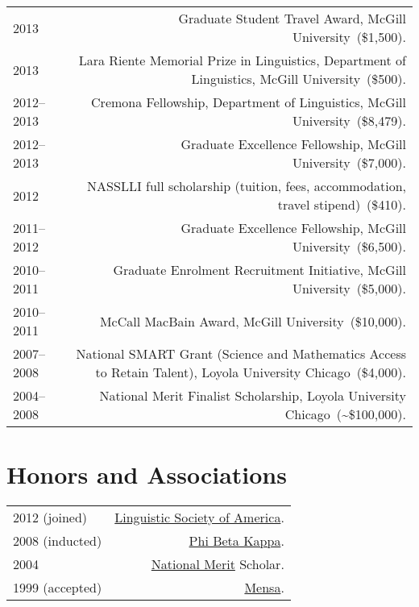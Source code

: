 \documentclass[letterpaper]{article}
\makeatletter
\newcommand{\myvrule}{\color{lightgray}\vrule width 1.0pt}
\newenvironment{cvsection}{%
  \vspace{-3ex}
  \renewcommand{\arraystretch}{1.5}
  \begin{longtable}{@{} L R @{}}
}{%
  \end{longtable}
  \vspace{1ex}
  \renewcommand{\arraystretch}{1.0}
}
\newcommand{\award}[2]{%
  #1~(#2). %
}
\makeatother
\begin{document}
\begin{cvsection}
  2013 & \award{Graduate Student Travel Award, McGill University}{\$1,500} \\

  2013 & \award{Lara Riente Memorial Prize in Linguistics, Department of
  Linguistics, McGill University}{\$500} \\

  2012--2013 & \award{Cremona Fellowship, Department of Linguistics, McGill
  University}{\$8,479} \\

  2012--2013 & \award{Graduate Excellence Fellowship, McGill
  University}{\$7,000} \\

  2012 & \award{NASSLLI full scholarship (tuition, fees, accommodation, travel
  stipend)}{\$410} \\

  2011--2012 & \award{Graduate Excellence Fellowship, McGill
  University}{\$6,500} \\

  2010--2011 & \award{Graduate Enrolment Recruitment Initiative, McGill
  University}{\$5,000} \\

  2010--2011 & \award{McCall MacBain Award, McGill University}{\$10,000} \\

  2007--2008 & \award{National SMART Grant (Science and Mathematics Access to
  Retain Talent), Loyola University Chicago}{\$4,000} \\

  2004--2008 & \award{National Merit Finalist Scholarship, Loyola University
  Chicago}{\textasciitilde\$100,000} \\
\end{cvsection}



\section*{Honors and Associations}

\begin{cvsection}
  2012 {\footnotesize (joined)} &
  \href{http://www.linguisticsociety.org/}{Linguistic Society of America}. \\

  2008 {\footnotesize (inducted)} & \href{http://www.pbk.org/}{Phi Beta Kappa}. \\

  2004 & \href{http://www.nationalmerit.org/}{National Merit} Scholar. \\

  1999 {\footnotesize (accepted)} & \href{http://www.mensa.org/}{Mensa}.
\end{cvsection}
\end{document}

